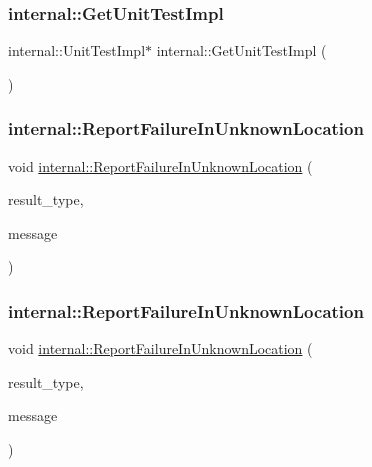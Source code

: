 \subsubsection{\texorpdfstring{internal::GetUnitTestImpl}{internal::GetUnitTestImpl}\hspace{0.1cm}{\footnotesize\ttfamily [3/3]}}
{\footnotesize\ttfamily internal\+::\+Unit\+Test\+Impl$\ast$ internal\+::\+Get\+Unit\+Test\+Impl (\begin{DoxyParamCaption}{ }\end{DoxyParamCaption})\hspace{0.3cm}{\ttfamily [friend]}}

\mbox{\label{classtesting_1_1_unit_test_a73f5a158c13793b90c80d854c9a75120}} 
\subsubsection{\texorpdfstring{internal::ReportFailureInUnknownLocation}{internal::ReportFailureInUnknownLocation}\hspace{0.1cm}{\footnotesize\ttfamily [1/3]}}
{\footnotesize\ttfamily void \mbox{\hyperlink{namespacetesting_1_1internal_a85f6ff0e40f9a5f10af66a73cf1364fa}{internal\+::\+Report\+Failure\+In\+Unknown\+Location}} (\begin{DoxyParamCaption}\item[{Test\+Part\+Result\+::\+Type}]{result\+\_\+type,  }\item[{const std\+::string \&}]{message }\end{DoxyParamCaption})\hspace{0.3cm}{\ttfamily [friend]}}

\mbox{\label{classtesting_1_1_unit_test_a73f5a158c13793b90c80d854c9a75120}} 
\subsubsection{\texorpdfstring{internal::ReportFailureInUnknownLocation}{internal::ReportFailureInUnknownLocation}\hspace{0.1cm}{\footnotesize\ttfamily [2/3]}}
{\footnotesize\ttfamily void \mbox{\hyperlink{namespacetesting_1_1internal_a85f6ff0e40f9a5f10af66a73cf1364fa}{internal\+::\+Report\+Failure\+In\+Unknown\+Location}} (\begin{DoxyParamCaption}\item[{Test\+Part\+Result\+::\+Type}]{result\+\_\+type,  }\item[{const std\+::string \&}]{message }\end{DoxyParamCaption})\hspace{0.3cm}{\ttfamily [friend]}}


